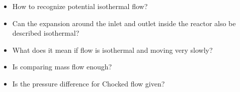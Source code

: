 {\color{greenColor}\itshape

\begin{itemize}
	\item How to recognize potential isothermal flow?
	\item Can the expansion around the inlet and outlet inside the reactor also be described isothermal?
	\item What does it mean if flow is isothermal and moving very slowly?
	\item Is comparing mass flow enough?
	\item Is the pressure difference for Chocked flow given?
\end{itemize}

}
